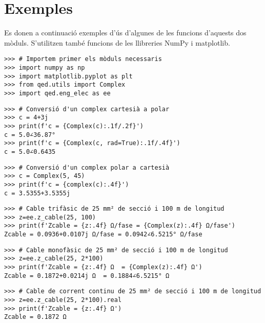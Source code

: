 


\section{Exemples}\label{sec:exemples-qed}
Es donen a continuació  exemples d'ús d'algunes de les funcions d'aquests dos mòduls. S'utilitzen també funcions de les llibreries NumPy i  matplotlib.

\begin{lstlisting}
>>> # Importem primer els mòduls necessaris
>>> import numpy as np
>>> import matplotlib.pyplot as plt
>>> from qed.utils import Complex
>>> import qed.eng_elec as ee
\end{lstlisting}

\begin{lstlisting}
>>> # Conversió d'un complex cartesià a polar
>>> c = 4+3j
>>> print(f'c = {Complex(c):.1f/.2f}')
c = 5.0∠36.87°
>>> print(f'c = {Complex(c, rad=True):.1f/.4f}')
c = 5.0∠0.6435
\end{lstlisting} 

\begin{lstlisting}
>>> # Conversió d'un complex polar a cartesià
>>> c = Complex(5, 45)
>>> print(f'c = {complex(c):.4f}')
c = 3.5355+3.5355j
\end{lstlisting}

\begin{lstlisting}
>>> # Cable trifàsic de 25 mm² de secció i 100 m de longitud
>>> z=ee.z_cable(25, 100)
>>> print(f'Zcable = {z:.4f} Ω/fase = {Complex(z):.4f} Ω/fase')
Zcable = 0.0936+0.0107j Ω/fase = 0.0942∠6.5215° Ω/fase	
\end{lstlisting} 

\begin{lstlisting}
>>> # Cable monofàsic de 25 mm² de secció i 100 m de longitud
>>> z=ee.z_cable(25, 2*100)
>>> print(f'Zcable = {z:.4f} Ω  = {Complex(z):.4f} Ω')
Zcable = 0.1872+0.0214j Ω  = 0.1884∠6.5215° Ω	
\end{lstlisting}

\begin{lstlisting}
>>> # Cable de corrent continu de 25 mm² de secció i 100 m de longitud
>>> z=ee.z_cable(25, 2*100).real
>>> print(f'Zcable = {z:.4f} Ω')
Zcable = 0.1872 Ω	
\end{lstlisting}

